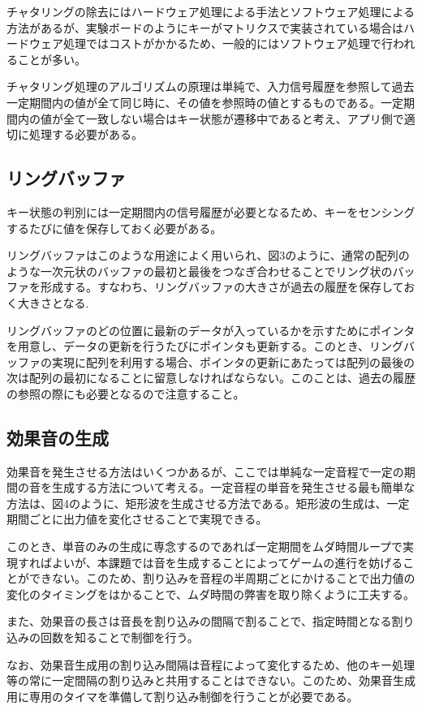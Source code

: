 ﻿\documentclass{jarticle}
\begin{document}
チャタリングの除去にはハードウェア処理による手法とソフトウェア処理による方法があるが、実験ボードのようにキーがマトリクスで実装されている場合はハードウェア処理ではコストがかかるため、一般的にはソフトウェア処理で行われることが多い。


チャタリング処理のアルゴリズムの原理は単純で、入力信号履歴を参照して過去一定期間内の値が全て同じ時に、その値を参照時の値とするものである。一定期間内の値が全て一致しない場合はキー状態が遷移中であると考え、アプリ側で適切に処理する必要がある。

\subsection{リングバッファ}
キー状態の判別には一定期間内の信号履歴が必要となるため、キーをセンシングするたびに値を保存しておく必要がある。


リングバッファはこのような用途によく用いられ、図3のように、通常の配列のような一次元状のバッファの最初と最後をつなぎ合わせることでリング状のバッファを形成する。すなわち、リングバッファの大きさが過去の履歴を保存しておく大きさとなる.


リングバッファのどの位置に最新のデータが入っているかを示すためにポインタを用意し、データの更新を行うたびにポインタも更新する。このとき、リングバッファの実現に配列を利用する場合、ポインタの更新にあたっては配列の最後の次は配列の最初になることに留意しなければならない。このことは、過去の履歴の参照の際にも必要となるので注意すること。


\subsection{効果音の生成}
効果音を発生させる方法はいくつかあるが、ここでは単純な一定音程で一定の期間の音を生成する方法について考える。一定音程の単音を発生させる最も簡単な方法は、図4のように、矩形波を生成させる方法である。矩形波の生成は、一定期間ごとに出力値を変化させることで実現できる。


このとき、単音のみの生成に専念するのであれば一定期間をムダ時間ループで実現すればよいが、本課題では音を生成することによってゲームの進行を妨げることができない。このため、割り込みを音程の半周期ごとにかけることで出力値の変化のタイミングをはかることで、ムダ時間の弊害を取り除くように工夫する。


また、効果音の長さは音長を割り込みの間隔で割ることで、指定時間となる割り込みの回数を知ることで制御を行う。


なお、効果音生成用の割り込み間隔は音程によって変化するため、他のキー処理等の常に一定間隔の割り込みと共用することはできない。このため、効果音生成用に専用のタイマを準備して割り込み制御を行うことが必要である。
\end{document}
